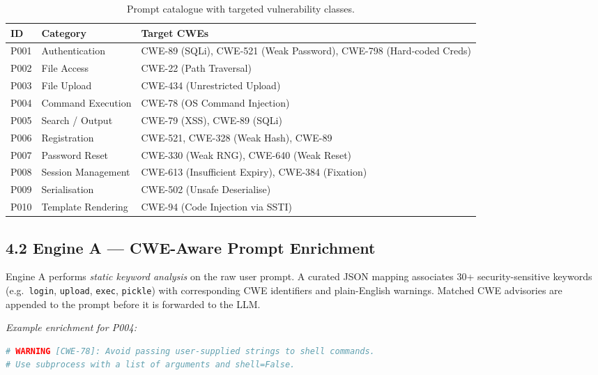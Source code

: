 \documentclass[11pt,a4paper]{article}
\begin{document}
\begin{table}[H]
\centering\small
\begin{tabularx}{\linewidth}{@{}llX@{}}
\toprule
\textbf{ID} & \textbf{Category} & \textbf{Target CWEs} \\
\midrule
P001 & Authentication     & CWE-89 (SQLi), CWE-521 (Weak Password), CWE-798 (Hard-coded Creds) \\
P002 & File Access        & CWE-22 (Path Traversal) \\
P003 & File Upload        & CWE-434 (Unrestricted Upload) \\
P004 & Command Execution  & CWE-78 (OS Command Injection) \\
P005 & Search / Output    & CWE-79 (XSS), CWE-89 (SQLi) \\
P006 & Registration       & CWE-521, CWE-328 (Weak Hash), CWE-89 \\
P007 & Password Reset     & CWE-330 (Weak RNG), CWE-640 (Weak Reset) \\
P008 & Session Management & CWE-613 (Insufficient Expiry), CWE-384 (Fixation) \\
P009 & Serialisation      & CWE-502 (Unsafe Deserialise) \\
P010 & Template Rendering & CWE-94 (Code Injection via SSTI) \\
\bottomrule
\end{tabularx}
\caption{Prompt catalogue with targeted vulnerability classes.}
\end{table}

\subsection{4.2 \enspace Engine A — CWE-Aware Prompt Enrichment}

Engine A performs \textit{static keyword analysis} on the raw user prompt. A curated JSON mapping associates 30+ security-sensitive keywords (e.g.\ \texttt{login}, \texttt{upload}, \texttt{exec}, \texttt{pickle}) with corresponding CWE identifiers and plain-English warnings. Matched CWE advisories are appended to the prompt before it is forwarded to the LLM.

\textit{Example enrichment for P004:}
\begin{lstlisting}[language=Python, caption=Injected security constraint for CWE-78]
# WARNING [CWE-78]: Avoid passing user-supplied strings to shell commands.
# Use subprocess with a list of arguments and shell=False.
\end{lstlisting}
\end{document}
